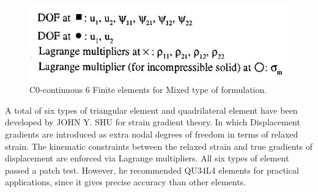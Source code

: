 \documentclass[12pt]{article}
\begin{document}
\begin{figure}[H]
	\begin{center}
		\includegraphics[scale=0.8]{Shu_info.JPG}
	\end{center}  
    \caption{C0-continuous 6 Finite elements for Mixed type of formulation. \cite{shu1999finite}}
\end{figure}
A total of six types of triangular element and quadrilateral element have been developed by JOHN Y. SHU for strain gradient theory. In which Displacement gradients are introduced as extra nodal degrees of freedom in terms of relaxed strain. The kinematic constraints between the relaxed strain and true gradients of displacement are enforced via Lagrange multipliers. All six types of element passed a patch test. However, he recommended QU34L4 elements for practical applications, since it gives precise accuracy than other elements.
\end{document}
